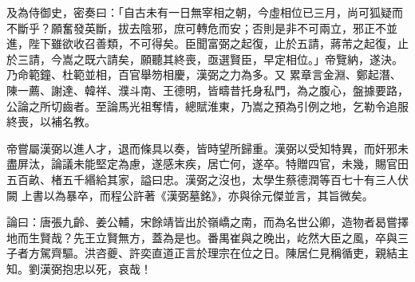 \begin{pinyinscope}
 及為侍御史，密奏曰：「自古未有一日無宰相之朝，今虛相位已三月，尚可狐疑而不斷乎？願奮發英斷，拔去陰邪，庶可轉危而安；否則是非不可兩立，邪正不並進，陛下雖欲收召善類，不可得矣。臣聞富弼之起復，止於五請，蔣芾之起復，止於三請，今嵩之既六請矣，願聽其終喪，亟選賢臣，早定相位。」帝覽納，遂決。乃命範鐘、杜範並相，百官舉笏相慶，漢弼之力為多。又
 累章言金淵、鄭起潛、陳一薦、謝達、韓祥、濮斗南、王德明，皆疇昔托身私門，為之腹心，盤據要路，公論之所切齒者。至論馬光祖奪情，總賦淮東，乃嵩之預為引例之地，乞勒令追服終喪，以補名教。



 帝嘗屬漢弼以進人才，退而條具以奏，皆時望所歸重。漢弼以受知特異，而奸邪未盡屏汰，論議未能堅定為慮，遂感末疾，居亡何，遂卒。特贈四官，未幾，賜官田五百畝、楮五千緡給其家，謚曰忠。漢弼之沒也，太學生蔡德潤等百七十有三人伏闕
 上書以為暴卒，而程公許著《漢弼墓銘》，亦與徐元傑並言，其旨微矣。



 論曰：唐張九齡、姜公輔，宋餘靖皆出於嶺嶠之南，而為名世公卿，造物者曷嘗擇地而生賢哉？先王立賢無方，蓋為是也。番禺崔與之晚出，屹然大臣之風，卒與三子者方駕齊驅。洪咨夔、許奕直道正言於理宗在位之日。陳居仁見稱循吏，親結主知。劉漢弼抱忠以死，哀哉！



\end{pinyinscope}